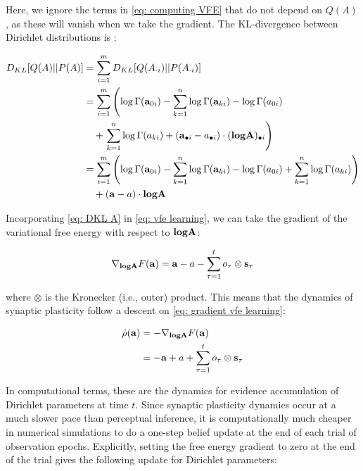 \documentclass[review,12pt,authoryear]{elsarticle}
\begin{document}
Here, we ignore the terms in \eqref{eq: computing VFE} that do not depend on $Q(A)$, as these will vanish when we take the gradient. The KL-divergence between Dirichlet distributions is \citep{kurtKullbackLeiblerDivergenceTwo2013,pennyKLdivergenceNormalGamma2001}:	 
  	
  	\begin{equation}
  	\label{eq: DKL A}
  	    \begin{split}
  	        D_{KL}[Q(A)||P(A)]&=\sum_{i=1}^m D_{KL}[Q(A_{\cdot i})||P(A_{\cdot i})] \\
  	        &= \sum_{i=1}^m \left( \log \Gamma(\bold a_{0i})- \sum_{k=1}^n \log \Gamma(\bold a_{ki}) -\log \Gamma( a_{0i}) \right.\\
  	        &\quad + \left.\sum_{k=1}^n \log \Gamma( a_{ki}) + (\bold a_{\bullet i}- a_{\bullet i})\cdot (\textbf{log}\bold A)_{\bullet i}\right) \\
  	        &= \sum_{i=1}^m \left( \log \Gamma(\bold a_{0i})- \sum_{k=1}^n \log \Gamma(\bold a_{ki}) -\log \Gamma( a_{0i})+ \sum_{k=1}^n \log \Gamma( a_{ki})\right)\\
  	        &\quad+ (\bold a- a)\cdot \textbf{log}\bold A
  	    \end{split}
  	\end{equation}
  	
Incorporating \eqref{eq: DKL A} in \eqref{eq: vfe learning}, we can take the gradient of the variational free energy with respect to $\textbf{log} \bold A$:

  	\begin{equation}
  	\label{eq: gradient vfe learning}
  	    \nabla_{\textbf{log}\bold A} F(\bold a)= \bold a -a -\sum_{\tau =1}^t o_\tau \otimes \bold s_\tau
  	\end{equation}
  	
where $\otimes$ is the Kronecker (i.e., outer) product. This means that the dynamics of synaptic plasticity follow a descent on \eqref{eq: gradient vfe learning}:

    \begin{equation}
    \begin{split}
         \dot \rho(\bold a) &= -\nabla_{\textbf{log}\bold A} F(\bold a)\\
         &= -\bold a +a +\sum_{\tau =1}^t o_\tau \otimes \bold s_\tau
    \end{split}
    \end{equation}

In computational terms, these are the dynamics for evidence accumulation of Dirichlet parameters at time $t$. Since synaptic plasticity dynamics occur at a much slower pace than perceptual inference, it is computationally much cheaper in numerical simulations to do a one-step belief update at the end of each trial of observation epochs. Explicitly, setting the free energy gradient to zero at the end of the trial gives the following update for Dirichlet parameters:
\end{document}
